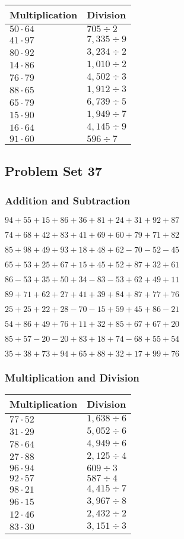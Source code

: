 \begin{longtable}[]{@{}ll@{}}
\toprule
Multiplication & Division\tabularnewline
\midrule
\endhead
\(50\cdot64\) & \(705÷2\)\tabularnewline
\(41\cdot97\) & \(7,335÷9\)\tabularnewline
\(80\cdot92\) & \(3,234÷2\)\tabularnewline
\(14\cdot86\) & \(1,010÷2\)\tabularnewline
\(76\cdot79\) & \(4,502÷3\)\tabularnewline
\(88\cdot65\) & \(1,912÷3\)\tabularnewline
\(65\cdot79\) & \(6,739÷5\)\tabularnewline
\(15\cdot90\) & \(1,949÷7\)\tabularnewline
\(16\cdot64\) & \(4,145÷9\)\tabularnewline
\(91\cdot60\) & \(596÷7\)\tabularnewline
\bottomrule
\end{longtable}

\hypertarget{problem-set-37-1}{%
\subsection{Problem Set 37}\label{problem-set-37-1}}

\hypertarget{addition-and-subtraction-77}{%
\subsubsection{Addition and
Subtraction}\label{addition-and-subtraction-77}}

\(94+55+15+86+36+81+24+31+92+ 87\)

\(74+68+42+83+41+69+60+79+71+82\)

\(85+98+49+93+18+48+62-70-52-45\)

\(65+53+25+67+15+45+52+87+32+61\)

\(86-53+35+50+34-83-53+62+49+11\)

\(89+71+62+27+41+39+84+87+77+76\)

\(25+25+22+28-70-15+59+45+86-21\)

\(54+86+49+76+11+32+85+67+67+20\)

\(85+57-20-20+83+18+74-68+55+54\)

\(35+38+73+94+65+88+32+17+99+76\)

\hypertarget{multiplication-and-division-77}{%
\subsubsection{Multiplication and
Division}\label{multiplication-and-division-77}}

\begin{longtable}[]{@{}ll@{}}
\toprule
Multiplication & Division\tabularnewline
\midrule
\endhead
\(77\cdot52\) & \(1,638÷6\)\tabularnewline
\(31\cdot29\) & \(5,052÷6\)\tabularnewline
\(78\cdot64\) & \(4,949÷6\)\tabularnewline
\(27\cdot88\) & \(2,125÷4\)\tabularnewline
\(96\cdot94\) & \(609÷3\)\tabularnewline
\(92\cdot57\) & \(587÷4\)\tabularnewline
\(98\cdot21\) & \(4,415÷7\)\tabularnewline
\(96\cdot15\) & \(3,967÷8\)\tabularnewline
\(12\cdot46\) & \(2,432÷2\)\tabularnewline
\(83\cdot30\) & \(3,151÷3\)\tabularnewline
\bottomrule
\end{longtable}

